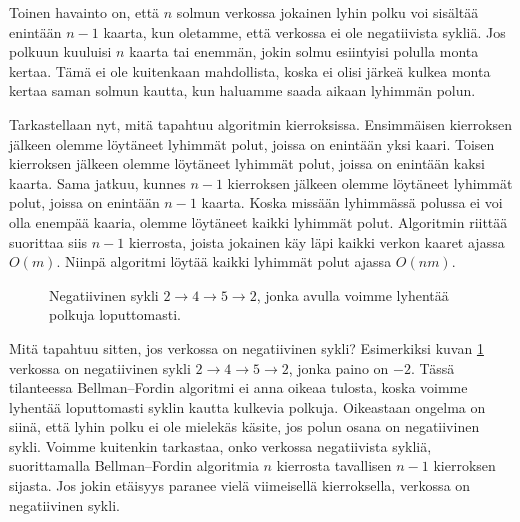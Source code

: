 Toinen havainto on,
että $n$ solmun verkossa jokainen lyhin polku voi
sisältää enintään $n-1$ kaarta,
kun oletamme, että verkossa ei ole negatiivista sykliä.
Jos polkuun kuuluisi $n$ kaarta tai enemmän,
jokin solmu esiintyisi polulla monta kertaa.
Tämä ei ole kuitenkaan mahdollista,
koska ei olisi järkeä kulkea monta kertaa saman solmun kautta,
kun haluamme saada aikaan lyhimmän polun.

Tarkastellaan nyt, mitä tapahtuu algoritmin kierroksissa.
Ensimmäisen kierroksen jälkeen olemme löytäneet lyhimmät polut,
joissa on enintään yksi kaari.
Toisen kierroksen jälkeen olemme löytäneet lyhimmät polut,
joissa on enintään kaksi kaarta.
Sama jatkuu, kunnes $n-1$ kierroksen jälkeen olemme löytäneet
lyhimmät polut, joissa on enintään $n-1$ kaarta.
Koska missään lyhimmässä polussa ei voi olla enempää kaaria,
olemme löytäneet kaikki lyhimmät polut.
Algoritmin riittää suorittaa siis $n-1$ kierrosta,
joista jokainen käy läpi kaikki verkon kaaret ajassa $O(m)$.
Niinpä algoritmi löytää kaikki lyhimmät polut ajassa $O(nm)$.

\begin{figure}
\center
\begin{center}
\end{center}
\caption{Negatiivinen sykli $2 \rightarrow 4 \rightarrow 5 \rightarrow 2$,
jonka avulla voimme lyhentää polkuja loputtomasti.}
\label{fig:belsyk}
\end{figure}

Mitä tapahtuu sitten, jos verkossa on negatiivinen sykli?
Esimerkiksi kuvan \ref{fig:belsyk} verkossa on negatiivinen sykli
$2 \rightarrow 4 \rightarrow 5 \rightarrow 2$, jonka paino on $-2$.
Tässä tilanteessa Bellman–Fordin algoritmi ei anna oikeaa tulosta,
koska voimme lyhentää loputtomasti syklin kautta kulkevia polkuja.
Oikeastaan ongelma on siinä, että lyhin polku ei ole mielekäs käsite,
jos polun osana on negatiivinen sykli.
Voimme kuitenkin tarkastaa, onko verkossa negatiivista sykliä,
suorittamalla Bellman–Fordin algoritmia
$n$ kierrosta tavallisen $n-1$ kierroksen sijasta.
Jos jokin etäisyys paranee vielä viimeisellä kierroksella,
verkossa on negatiivinen sykli.

